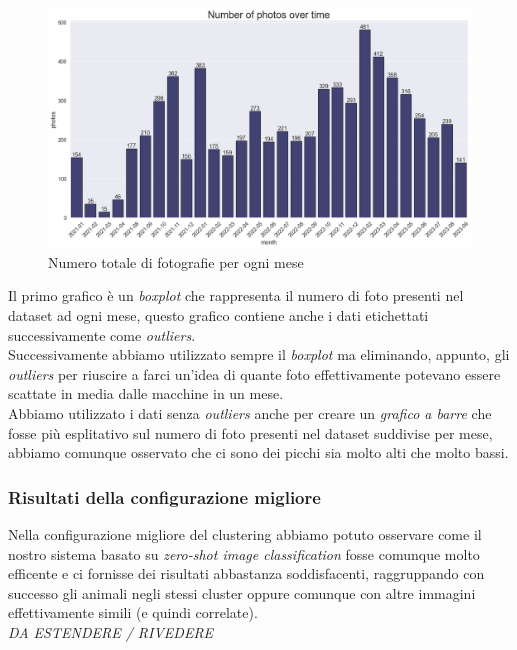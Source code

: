 \documentclass[12pt,a4paper,twoside]{article}
\begin{document}
\begin{figure}[h!]
    \centering
    \includegraphics[width=\textwidth, height=\textheight, keepaspectratio]{assets/photos-month.png}
    \caption{Numero totale di fotografie per ogni mese}
    \label{fig:photos-month}
\end{figure}
Il primo grafico è un \textit{boxplot} che rappresenta il numero di foto presenti nel dataset ad 
ogni mese, questo grafico contiene anche i dati etichettati successivamente come 
\textit{outliers}.\\ 
Successivamente abbiamo utilizzato sempre il \textit{boxplot} ma eliminando, appunto, gli 
\textit{outliers} per riuscire a farci un'idea di quante foto effettivamente potevano essere 
scattate in media dalle macchine in un mese.\\
Abbiamo utilizzato i dati senza \textit{outliers} anche per creare un \textit{grafico a barre} 
che fosse più esplitativo sul numero di foto presenti nel dataset suddivise per mese, abbiamo 
comunque osservato che ci sono dei picchi sia molto alti che molto bassi.


\subsubsection{Risultati della configurazione migliore}
Nella configurazione migliore del clustering abbiamo potuto osservare come il nostro sistema 
basato su \textit{zero-shot image classification} fosse comunque molto efficente e ci fornisse 
dei risultati abbastanza soddisfacenti, raggruppando con successo gli animali negli stessi cluster 
oppure comunque con altre immagini effettivamente simili (e quindi correlate).\\ 
\textit{DA ESTENDERE / RIVEDERE}
\end{document}
